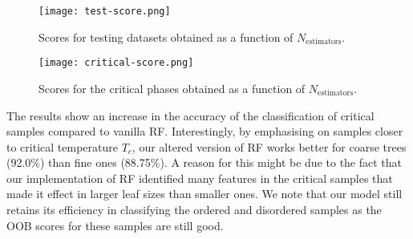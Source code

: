 \begin{figure}[h!]
    \centering
    \texttt{[image: test-score.png]}
    \caption{Scores for testing datasets obtained as a function of \( N_{\text{estimators}} \).}
\end{figure}

\begin{figure}[h!]
    \centering
    \texttt{[image: critical-score.png]}
    \caption{Scores for the critical phases obtained as a function of \( N_{\text{estimators}} \).}
\end{figure}

The results show an increase in the accuracy of the classification of critical samples compared to vanilla RF. Interestingly, by emphasising on samples closer to critical temperature $T_c$, our altered version of RF works better
for coarse trees (92.0\%) than fine ones (88.75\%). A reason for this might be due to the fact that our implementation of RF identified many features in the critical samples that made it effect in larger leaf sizes than smaller ones. We note that our model still retains its efficiency in classifying the ordered and disordered samples as the OOB scores for these samples are still good.

